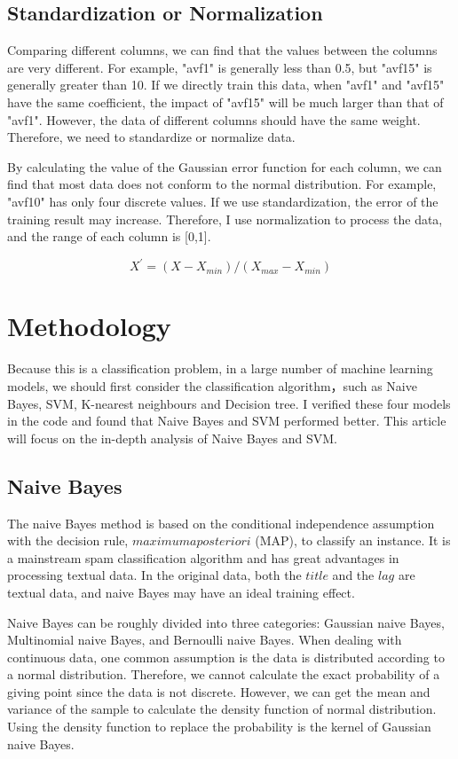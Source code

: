 \documentclass[11pt]{article}
\begin{document}
\subsection{Standardization or Normalization}

Comparing different columns, we can find that the values between the columns are very different. For example, "avf1" is generally less than 0.5, but "avf15" is generally greater than 10. If we directly train this data, when "avf1" and "avf15" have the same coefficient, the impact of "avf15" will be much larger than that of "avf1". However, the data of different columns should have the same weight. Therefore, we need to standardize or normalize data.

By calculating the value of the Gaussian error function for each column, we can find that most data does not conform to the normal distribution. For example, "avf10" has only four discrete values. If we use standardization, the error of the training result may increase. Therefore, I use normalization to process the data, and the range of each column is [0,1].

\[X^{'} = (X - X_{min}) / (X_{max} - X_{min})\]

\section{Methodology}

Because this is a classification problem, in a large number of machine learning models, we should first consider the classification algorithm，such as Naive Bayes, SVM, K-nearest neighbours and Decision tree. I verified these four models in the code and found that Naive Bayes and SVM performed better. This article will focus on the in-depth analysis of Naive Bayes and SVM.

\subsection{Naive Bayes}
The naive Bayes method is based on the conditional independence assumption with the decision rule, $maximum a posteriori$ (MAP), to classify an instance. It is a mainstream spam classification algorithm and has great advantages in processing textual data. In the original data, both the $title$ and the $lag$ are textual data, and naive Bayes may have an ideal training effect.

Naive Bayes can be roughly divided into three categories: Gaussian naive Bayes, Multinomial naive Bayes, and Bernoulli naive Bayes. When dealing with continuous data, one common assumption is the data is distributed according to a normal distribution. Therefore, we cannot calculate the exact probability of a giving point since the data is not discrete. However, we can get the mean and variance of the sample to calculate the density function of normal distribution. Using the density function to replace the probability is the kernel of Gaussian naive Bayes.
\end{document}
